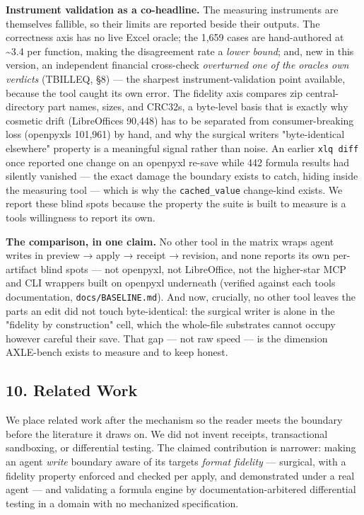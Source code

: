 \documentclass[
]{article}
\newcounter{none} %
\begin{document}
\textbf{Instrument validation as a co-headline.} The measuring
instruments are themselves fallible, so their limits are reported beside
their outputs. The correctness axis has no live Excel oracle; the 1,659
cases are hand-authored at \textasciitilde3.4 per function, making the
disagreement rate a \emph{lower bound}; and, new in this version, an
independent financial cross-check \emph{overturned one of the
oracle\textquotesingle s own verdicts} (TBILLEQ, §8) --- the sharpest
instrument-validation point available, because the tool caught its own
error. The fidelity axis compares zip central-directory part names,
sizes, and CRC32s, a byte-level basis that is exactly why cosmetic drift
(LibreOffice\textquotesingle s 90,448) has to be separated from
consumer-breaking loss (openpyxl\textquotesingle s 101,961) by hand, and
why the surgical writer\textquotesingle s "byte-identical elsewhere"
property is a meaningful signal rather than noise. An earlier
\texttt{xlq\ diff} once reported one change on an openpyxl re-save while
442 formula results had silently vanished --- the exact damage the
boundary exists to catch, hiding inside the measuring tool --- which is
why the \texttt{cached\_value} change-kind exists. We report these blind
spots because the property the suite is built to measure is a
tool\textquotesingle s willingness to report its own.

\textbf{The comparison, in one claim.} No other tool in the matrix wraps
agent writes in preview → apply → receipt → revision, and none reports
its own per-artifact blind spots --- not openpyxl, not LibreOffice, not
the higher-star MCP and CLI wrappers built on openpyxl underneath
(verified against each tool\textquotesingle s documentation,
\texttt{docs/BASELINE.md}). And now, crucially, no other tool leaves the
parts an edit did not touch byte-identical: the surgical writer is alone
in the "fidelity by construction" cell, which the whole-file substrates
cannot occupy however careful their save. That gap --- not raw speed ---
is the dimension AXLE-bench exists to measure and to keep honest.

\subsection{10. Related Work}\label{10-related-work}

We place related work after the mechanism so the reader meets the
boundary before the literature it draws on. We did not invent receipts,
transactional sandboxing, or differential testing. The claimed
contribution is narrower: making an agent \emph{write} boundary aware of
its target\textquotesingle s \emph{format fidelity} --- surgical, with a
fidelity property enforced and checked per apply, and demonstrated under
a real agent --- and validating a formula engine by
documentation-arbitered differential testing in a domain with no
mechanized specification.
\end{document}

